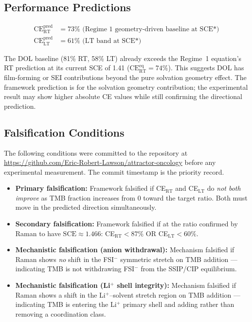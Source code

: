\documentclass[11pt]{article}
\theoremstyle{plain}
\theoremstyle{definition}
\theoremstyle{remark}
\begin{document}
\subsection{Performance Predictions}

\begin{align*}
  \mathrm{CE}_{\mathrm{RT}}^{\mathrm{pred}}
  &= 73\% \text{ (Regime~1 geometry-driven baseline at SCE*)}\\
  \mathrm{CE}_{\mathrm{LT}}^{\mathrm{pred}}
  &= 61\% \text{ (LT band at SCE*)}
\end{align*}

The DOL baseline (81\% RT, 58\% LT) already exceeds the Regime~1
equation's RT prediction at its current SCE of 1.41
($\mathrm{CE}_{\mathrm{RT}}^{\mathrm{eq}} = 74\%$).  This suggests
DOL has film-forming or SEI contributions beyond the pure solvation
geometry effect.  The framework prediction is for the solvation geometry
contribution; the experimental result may show higher absolute CE values
while still confirming the directional prediction.

\subsection{Falsification Conditions}

The following conditions were committed to the repository at
\url{https://github.com/Eric-Robert-Lawson/attractor-oncology}
before any experimental measurement.  The commit timestamp is the
priority record.

\begin{itemize}[leftmargin=2em]
  \item \textbf{Primary falsification:} Framework falsified if
        CE$_{\mathrm{RT}}$ and CE$_{\mathrm{LT}}$ do \emph{not both
        improve} as TMB fraction increases from 0 toward the target
        ratio.  Both must move in the predicted direction simultaneously.
  \item \textbf{Secondary falsification:} Framework falsified if at
        the ratio confirmed by Raman to have $\mathrm{SCE} \approx 1.466$:
        CE$_{\mathrm{RT}} < 87\%$ OR CE$_{\mathrm{LT}} < 60\%$.
  \item \textbf{Mechanistic falsification (anion withdrawal):}
        Mechanism falsified if Raman shows \emph{no} shift in the
        FSI$^-$ symmetric stretch on TMB addition --- indicating TMB
        is not withdrawing FSI$^-$ from the SSIP/CIP equilibrium.
  \item \textbf{Mechanistic falsification (Li$^+$ shell integrity):}
        Mechanism falsified if Raman shows a shift in the Li$^+$--solvent
        stretch region on TMB addition --- indicating TMB is entering
        the Li$^+$ primary shell and adding rather than removing a
        coordination class.
\end{itemize}
\end{document}

